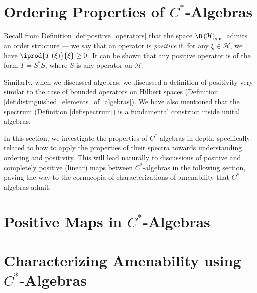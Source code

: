 \section{Ordering Properties of \texorpdfstring{$C^{\ast}$-Algebras}{C*-Algebras}}%
Recall from Definition \ref{def:positive_operators} that the space $\B\left( \mathcal{H} \right)_{\sa}$ admits an order structure --- we say that an operator is \textit{positive} if, for any $\xi\in \mathcal{H}$, we have $ \iprod{T\left( \xi \right)}{\xi} \geq 0 $. It can be shown that any positive operator is of the form $T = S^{\ast}S$, where $S$ is any operator on $\mathcal{H}$.\newline

Similarly, when we discussed algebras, we discussed a definition of positivity very similar to the case of bounded operators on Hilbert spaces (Definition \ref{def:distinguished_elements_of_algebras}). We have also mentioned that the spectrum (Definition \ref{def:spectrum}) is a fundamental construct inside unital algebras.\newline

In this section, we investigate the properties of $C^{\ast}$-algebras in depth, specifically related to how to apply the properties of their spectra towards understanding ordering and positivity. This will lead naturally to discussions of positive and completely positive (linear) maps between $C^{\ast}$-algebras in the following section, paving the way to the cornucopia of characterizations of amenability that $C^{\ast}$-algebras admit.
\section{Positive Maps in \texorpdfstring{$C^{\ast}$-Algebras}{C*-Algebras}}%

\section{Characterizing Amenability using \texorpdfstring{$C^{\ast}$-Algebras}{C*-Algebras}}%

